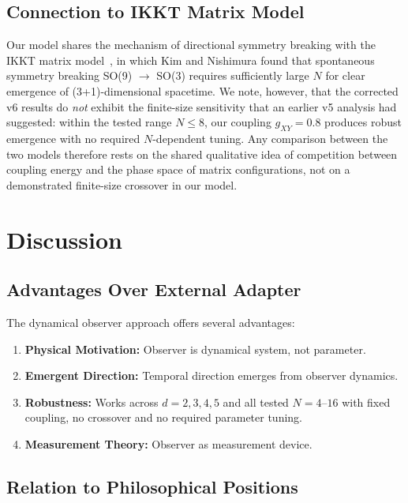 \documentclass[12pt,a4paper]{article}
\begin{document}
\subsection{Connection to IKKT Matrix Model}

Our model shares the mechanism of directional symmetry breaking with the IKKT
matrix model~\cite{kim_nishimura_2011, kim_nishimura_2019}, in which Kim and
Nishimura found that spontaneous symmetry breaking
SO(9) $\rightarrow$ SO(3) requires sufficiently large $N$ for clear emergence
of (3+1)-dimensional spacetime. We note, however, that the corrected v6
results do \emph{not} exhibit the finite-size sensitivity that an earlier v5
analysis had suggested: within the tested range $N \leq 8$, our coupling
$g_{XY}=0.8$ produces robust emergence with no required $N$-dependent tuning.
Any comparison between the two models therefore rests on the shared
qualitative idea of competition between coupling energy and the phase space
of matrix configurations, not on a demonstrated finite-size crossover in our
model.

\section{Discussion}\label{sec:discussion}

\subsection{Advantages Over External Adapter}

The dynamical observer approach offers several advantages:

\begin{enumerate}[leftmargin=*]
\item \textbf{Physical Motivation:} Observer is dynamical system, not parameter.
\item \textbf{Emergent Direction:} Temporal direction emerges from observer dynamics.
\item \textbf{Robustness:} Works across $d = 2,3,4,5$ and all tested $N = 4$--$16$ with
      fixed coupling, no crossover and no required parameter tuning.
\item \textbf{Measurement Theory:} Observer as measurement device.
\end{enumerate}

\subsection{Relation to Philosophical Positions}
\end{document}
